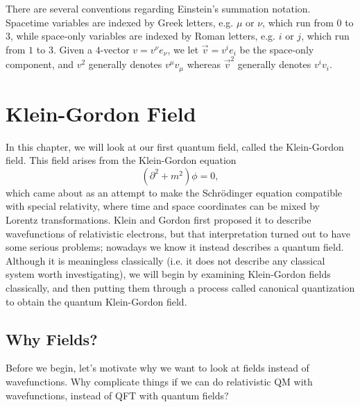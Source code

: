 \documentclass{report}
\theoremstyle{plain}
\theoremstyle{definition}
\theoremstyle{remark}
\begin{document}
There are several conventions regarding Einstein's summation notation.
Spacetime variables are indexed by Greek letters, e.g. $\mu$ or $\nu$,
which run from $0$ to $3$, while space-only variables are indexed by
Roman letters, e.g. $i$ or $j$, which run from $1$ to $3$. Given a
$4$-vector $v = v^\nu e_\nu$, we let $\vec{v} = v^i e_i$ be the
space-only component, and $v^2$ generally denotes $v^\mu v_\mu$
whereas $\vec{v}^2$ generally denotes $v^i v_i$.


\chapter{Klein-Gordon Field}

In this chapter, we will look at our first quantum field, called the
Klein-Gordon field. This field arises from the Klein-Gordon equation
$$ (\partial^2 + m^2)\phi = 0, $$ which came about as an attempt to
make the Schr\"odinger equation compatible with special relativity,
where time and space coordinates can be mixed by Lorentz
transformations. Klein and Gordon first proposed it to describe
wavefunctions of relativistic electrons, but that interpretation
turned out to have some serious problems; nowadays we know it instead
describes a quantum field. Although it is meaningless classically
(i.e. it does not describe any classical system worth investigating),
we will begin by examining Klein-Gordon fields classically, and then
putting them through a process called canonical quantization to obtain
the quantum Klein-Gordon field.

\section{Why Fields?}

Before we begin, let's motivate why we want to look at fields instead
of wavefunctions. Why complicate things if we can do relativistic QM
with wavefunctions, instead of QFT with quantum fields?

\end{document}

